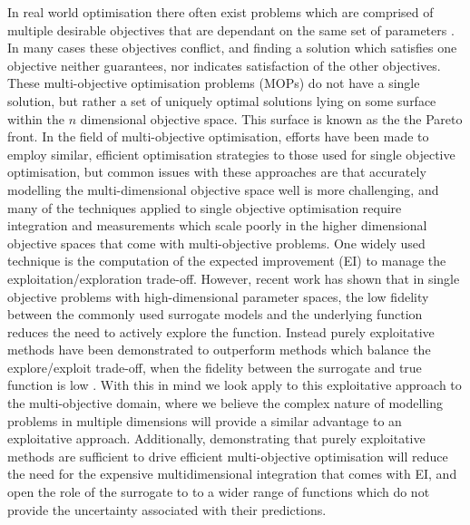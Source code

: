 \documentclass[runningheads]{llncs}
\begin{document}
In real world optimisation there often exist problems which are comprised of multiple desirable objectives that are dependant on the same set of parameters \cite{marler2004survey}. In many cases these objectives conflict, and finding a solution which satisfies one objective neither guarantees, nor indicates satisfaction of the other objectives. These multi-objective optimisation problems (MOPs) do not have a single solution, but rather a set of uniquely optimal solutions lying on some surface within the $n$ dimensional objective space. This surface is known as the the Pareto front. In the field of multi-objective optimisation, efforts have been made to employ similar, efficient optimisation strategies to those used for single objective optimisation, but common issues with these approaches are that accurately modelling the multi-dimensional objective space well is more challenging, and many of the techniques applied to single objective optimisation require integration and measurements which scale poorly in the higher dimensional objective spaces that come with multi-objective problems. One widely used technique is the computation of the expected improvement (EI) to manage the exploitation/exploration trade-off. However, recent work has shown that in single objective problems with high-dimensional parameter spaces, the low fidelity between the commonly used surrogate models and the underlying function reduces the need to actively explore the function. Instead purely exploitative methods have been demonstrated to outperform methods which balance the explore/exploit trade-off, when the fidelity between the surrogate and true function is low \cite{death2020greed}. With this in mind we look apply to this exploitative approach to the multi-objective domain, where we believe the complex nature of modelling problems in multiple dimensions will provide a similar advantage to an exploitative approach. Additionally, demonstrating that purely exploitative methods are sufficient to drive efficient multi-objective optimisation will reduce the need for the expensive multidimensional integration that comes with EI, and open the role of the surrogate to to a wider range of functions which do not provide the uncertainty associated with their predictions. 
\end{document}
